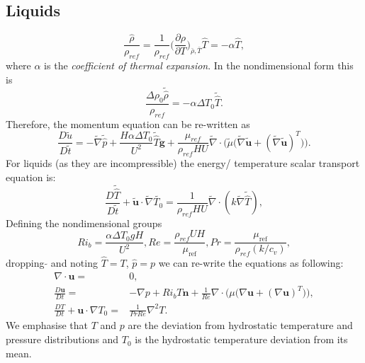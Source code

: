 \documentclass[preprint,12pt]{article}
\begin{document}
\subsection{Liquids}
 \begin{equation}
 \frac{\hat{\rho}}{\rho_{ref}}=\frac{1}{\rho_{ref}}\Big(\frac{\partial \rho}{\partial T}\Big)_{\bar{\rho},\bar{T}}\hat{T}=-\alpha\hat{T},
 \end{equation}
 where $\alpha$ is the \textit{coefficient of thermal expansion}. In the non\textendash dimensional form this is 
 \begin{equation}
\frac{\Delta \rho_0\tilde{\hat{\rho}}}{{\rho_{ref}}}=-\alpha\Delta T_0\tilde{\hat{T}}.
 \end{equation}
 Therefore, the momentum equation can be re-written as
 \begin{equation}
 \frac{D \tilde{u}}{D \tilde{t}}=-\tilde{\nabla}\tilde{\hat{p}}+\frac{H\alpha\Delta T_0}{U^2} \tilde{\hat{T}}\mathbf{g}+\frac{\mu_{ref}}{\rho_{ref}HU}\tilde{\nabla}\cdot\Big({\tilde{\mu}}\big({\tilde{\nabla}} \mathbf{\tilde{u}}+(\tilde{\nabla} \mathbf{\tilde{u}})^T\big)\Big).
 \end{equation}
 For liquids (as they are incompressible) the energy/ temperature scalar transport equation is:
\begin{equation}
\frac{D{\tilde{\hat{T}}}}{D{\tilde{t}}}+\mathbf{\tilde{u}}\cdot\tilde{\nabla}{\tilde{{T_0}}}=\frac{1}{\rho_{ref}HU}\tilde{\nabla}\cdot(k\tilde{\nabla} \tilde{\hat{T}}),
\end{equation}
Defining the non\textendash dimensional groups
\begin{equation}
Ri_b=\frac{\alpha {{\Delta T_0}}g H}{U^2}, Re=\frac{\rho_{ref} U H}{\mu_\text{ref}},  Pr=\frac{\mu_\text{ref}}{\rho_{ref} (k/c_v)},
\end{equation}
dropping $\tilde{}$ and noting $\hat{T}=T$, $\hat{p}=p$ we can re-write the equations as following:
 \begin{subequations}\begin{align}
\nabla\cdot\mathbf{u}=&0,\\
	\frac{D{\mathbf{u}}}{D{t}}=&-{\nabla} {p}+Ri_b T\mathbf{n} +\frac{1}{Re}{\nabla}\cdot\Big({\mu}\big({\nabla} \mathbf{{u}}+({\nabla} \mathbf{{u}})^T\big)\Big),\\
 \frac{D{T}}{D{t}}+\mathbf{{u}}\cdot{\nabla}{{{T_0}}}=&\frac{1}{Pr Re}\nabla^2 T.
	\end{align}\end{subequations}
We emphasise that $T$ and $p$ are the deviation from hydrostatic temperature and pressure distributions and ${T}_0$ is the hydrostatic temperature deviation from its mean.
\end{document}
